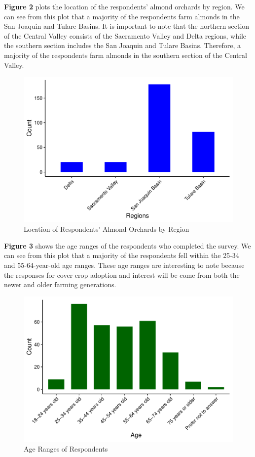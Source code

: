 \documentclass[12pt,]{article}
\begin{document}
\newpage

\textbf{Figure 2} plots the location of the respondents' almond orchards
by region. We can see from this plot that a majority of the respondents
farm almonds in the San Joaquin and Tulare Basins. It is important to
note that the northern section of the Central Valley consists of the
Sacramento Valley and Delta regions, while the southern section includes
the San Joaquin and Tulare Basins. Therefore, a majority of the
respondents farm almonds in the southern section of the Central Valley.

\begin{figure}
\centering
\includegraphics{Project_Template_files/figure-latex/unnamed-chunk-3-1.pdf}
\caption{Location of Respondents' Almond Orchards by Region}
\end{figure}

\newpage

\textbf{Figure 3} shows the age ranges of the respondents who completed
the survey. We can see from this plot that a majority of the respondents
fell within the 25-34 and 55-64-year-old age ranges. These age ranges
are interesting to note because the responses for cover crop adoption
and interest will be come from both the newer and older farming
generations.

\begin{figure}
\centering
\includegraphics{Project_Template_files/figure-latex/respondent age-1.pdf}
\caption{Age Ranges of Respondents}
\end{figure}
\end{document}
